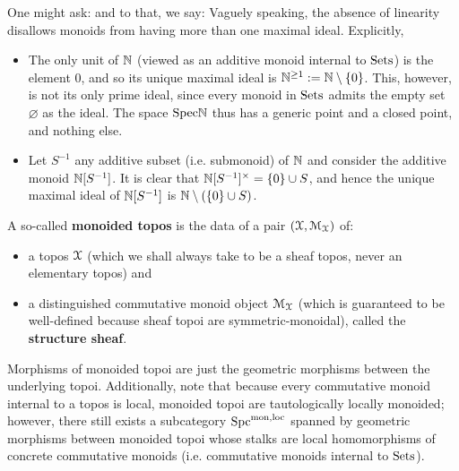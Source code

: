                 \begin{remark} \label{remark: linearity_gives_rise_to_many_maximal_ideals}
                    One might ask:  and to that, we say:  Vaguely speaking, the absence of linearity disallows monoids from having more than one maximal ideal. Explicitly,  
                \end{remark}
                \begin{example}
                    \noindent
                    \begin{itemize}
                        \item The only unit of $\mathbb{N}$ (viewed as an additive monoid internal to $\mathrm{Sets}$) is the element $0$, and so its unique maximal ideal is $\mathbb{N}^{\geq 1} := \mathbb{N} \setminus \{0\}$. This, however, is not its only prime ideal, since every monoid in $\mathrm{Sets}$ admits the empty set $\varnothing$ as the  ideal. The space $\mathrm{Spec} \mathbb{N}$ thus has a generic point and a closed point, and nothing else.
                        \item Let $S^{-1}$ any additive subset (i.e. submonoid) of $\mathbb{N}$ and consider the additive monoid $\mathbb{N}[S^{-1}]$. It is clear that $\N[S^{-1}]^{\x} = \{0\} \cup S$, and hence the unique maximal ideal of $\mathbb{N}[S^{-1}]$ is $\mathbb{N} \setminus (\{0\} \cup S)$. 
                    \end{itemize}
                \end{example}
                \begin{definition} \label{def: monoided_topoi}
                    A so-called \textbf{monoided topos} is the data of a pair $(\mathcal{X}, \mathcal{M}_{\mathcal{X}})$ of:
                        \begin{itemize}
                            \item a topos $\mathcal{X}$ (which we shall always take to be a sheaf topos, never an elementary topos) and
                            \item a distinguished commutative monoid object $\mathcal{M}_{\mathcal{X}}$ (which is guaranteed to be well-defined because sheaf topoi are symmetric-monoidal), called the \textbf{structure sheaf}.
                        \end{itemize}
                    Morphisms of monoided topoi are just the geometric morphisms between the underlying topoi. Additionally, note that because every commutative monoid internal to a topos is local, monoided topoi are tautologically locally monoided; however, there still exists a subcategory $\mathrm{Spc}^{\mathrm{mon}, \mathrm{loc}}$ spanned by geometric morphisms between monoided topoi whose stalks are local homomorphisms of concrete commutative monoids (i.e. commutative monoids internal to $\mathrm{Sets}$).
                \end{definition}
                
